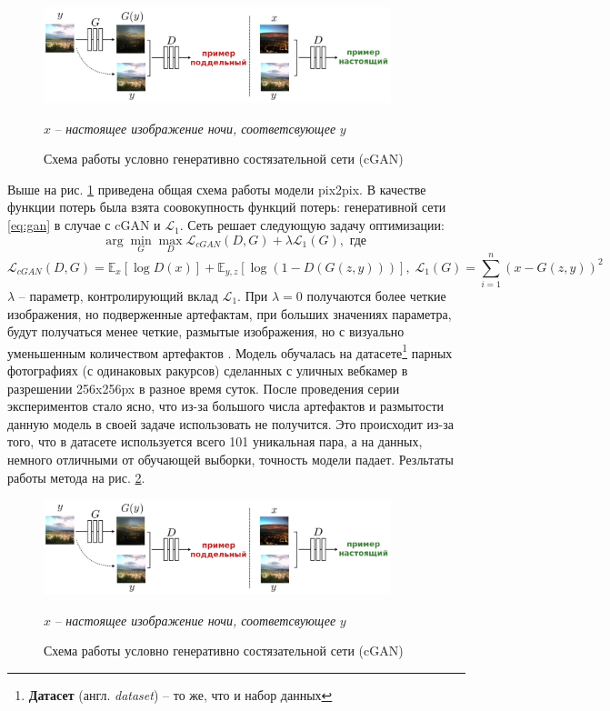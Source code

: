\documentclass[11pt,a4paper]{extarticle}
\begin{document}
				\begin{figure}[ht]
					\centering
					\includegraphics[width=0.9\textwidth]{img/cgan}
					\caption{Схема работы условно генеративно состязательной сети (cGAN)}{
						$x$ -- \emph{настоящее изображение ночи, соответсвующее} $y$
					}
					\label{fig:cgan}
				\end{figure}
				\noindent
				Выше на рис. \ref{fig:cgan} приведена общая схема работы модели pix2pix.
				В качестве функции потерь была взята соовокупность функций потерь: генеративной сети \eqref{eq:gan} в случае с cGAN и $\mathcal{L}_1$.
				Сеть решает следующую задачу оптимизации:
				\begin{equation}\label{eq:cgan}
					\arg\min_{G}\max_{D}\mathcal{L}_{cGAN}(D,G) + \lambda \mathcal{L}_1(G), \text{ где }
				\end{equation}
				\begin{equation*}
						\mathcal{L}_{cGAN}(D,G) = \mathbb{E}_{x}[\log{D(x)}] + \mathbb{E}_{y,z}[\log (1 - D(G(z,y)))],\;
						\mathcal{L}_1(G) = \sum_{i=1}^{n}(x - G(z,y))^2
				\end{equation*}
				$\lambda$ -- параметр, контролирующий вклад $\mathcal{L}_1$.
				При $\lambda = 0$ получаются более четкие изображения, но подверженные артефактам,
				при больших значениях параметра, будут получаться менее четкие, размытые изображения, но с визуально уменьшенным количеством артефактов \cite{pix2pix}.
				Модель обучалась на датасете\footnote{ \textbf{Датасет} (англ. \textit{dataset}) -- то же, что и набор данных} \cite{data:paired_night2day}
				парных фотографиях (с одинаковых ракурсов) сделанных с уличных вебкамер в разрешении 256x256px в разное время суток.
				После проведения серии экспериментов стало ясно, что из-за большого числа артефактов и размытости данную модель в своей задаче использовать не получится.
				Это происходит из-за того, что в датасете \cite{data:paired_night2day} используется всего 101 уникальная пара,
				а на данных, немного отличными от обучающей выборки, точность модели падает.
				Резльтаты работы метода на рис. \ref{fig:pix2pix_results}.
				
				\begin{figure}[ht]
					\centering
					\includegraphics[width=0.9\textwidth]{img/cgan}
					\caption{Схема работы условно генеративно состязательной сети (cGAN)}{
						$x$ -- \emph{настоящее изображение ночи, соответсвующее} $y$
					}
					\label{fig:pix2pix_results}
				\end{figure}
				
\end{document}
